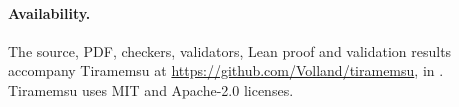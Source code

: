 \documentclass[11pt]{article}
\theoremstyle{plain}
\theoremstyle{definition}
\theoremstyle{remark}
\begin{document}
\paragraph{Availability.}
The source, PDF, checkers, validators, Lean proof and validation results accompany
Tiramemsu at \url{https://github.com/Volland/tiramemsu}, in
. Tiramemsu uses MIT and Apache-2.0 licenses.


\end{document}
